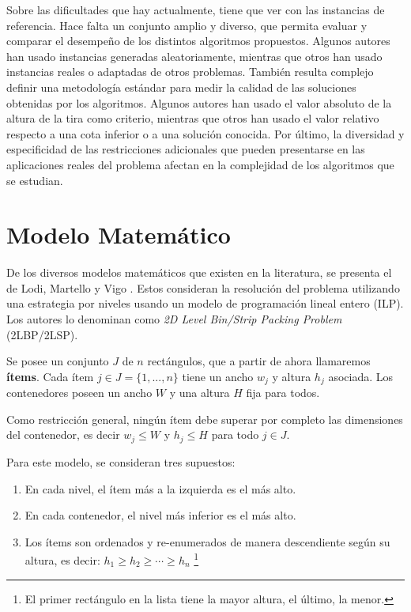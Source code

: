 \documentclass[letter, 10pt]{article}
\begin{document}
Sobre las dificultades que hay actualmente, tiene que ver con las instancias de referencia. Hace falta un conjunto amplio y diverso, que permita evaluar y comparar el desempeño de los distintos algoritmos propuestos. Algunos autores han usado instancias generadas aleatoriamente, mientras que otros han usado instancias reales o adaptadas de otros problemas. También resulta complejo definir una metodología estándar para medir la calidad de las soluciones obtenidas por los algoritmos. Algunos autores han usado el valor absoluto de la altura de la tira como criterio, mientras que otros han usado el valor relativo respecto a una cota inferior o a una solución conocida. Por último, la diversidad y especificidad de las restricciones adicionales que pueden presentarse en las aplicaciones reales del problema afectan en la complejidad de los algoritmos que se estudian.







\section{Modelo Matemático}

De los diversos modelos matemáticos que existen en la literatura, se presenta el de Lodi, Martello y Vigo \cite{lodi2004models}. Estos consideran la resolución del problema utilizando una estrategia por niveles usando un modelo de programación lineal entero (ILP). Los autores lo denominan como \textit{2D Level Bin/Strip Packing Problem} (2LBP/2LSP).

Se posee un conjunto $J$ de $n$ rectángulos, que a partir de ahora llamaremos \textbf{ítems}. Cada ítem $j \in J = \{1,...,n\}$ tiene un ancho $w_j$ y altura $h_j$ asociada. Los contenedores poseen un ancho $W$ y una altura $H$ fija para todos.

Como restricción general, ningún ítem debe superar por completo las dimensiones del contenedor, es decir $w_j \leq W$ y $h_j \leq  H$ para todo $j \in J$.

Para este modelo, se consideran tres supuestos:

\begin{enumerate}[label=(\roman*)]
    \item En cada nivel, el ítem más a la izquierda es el más alto.
    \item En cada contenedor, el nivel más inferior es el más alto.
    \item Los ítems son ordenados y re-enumerados de manera descendiente según su altura, es decir: $h_1 \geq  h_2 \geq \cdots \geq h_n$ \footnote{El primer rectángulo en la lista tiene la mayor altura, el último, la menor.}
\end{enumerate}
\end{document}
